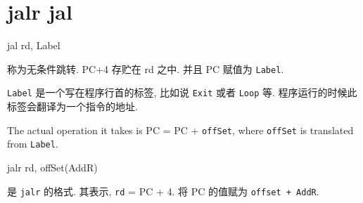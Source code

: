 \documentclass[11pt]{article}
\begin{document}
\section{jalr jal}
\label{sec:orga6e45ba}
\centerline{jal rd, Label}
称为无条件跳转. PC+4 存贮在 rd 之中. 并且 PC 赋值为 \texttt{Label}. 

\texttt{Label} 是一个写在程序行首的标签, 比如说 \texttt{Exit} 或者 \texttt{Loop} 等. 程序运行的时候此标签会翻译为一个指令的地址. 

The actual operation it takes is PC = PC + \texttt{offSet}, where \texttt{offSet} is translated from \texttt{Label}. 

\centerline{jalr rd, offSet(AddR)}
是 \texttt{jalr} 的格式. 其表示, \texttt{rd} = PC + 4. 将 PC 的值赋为 \texttt{offset + AddR}. 
\end{document}
